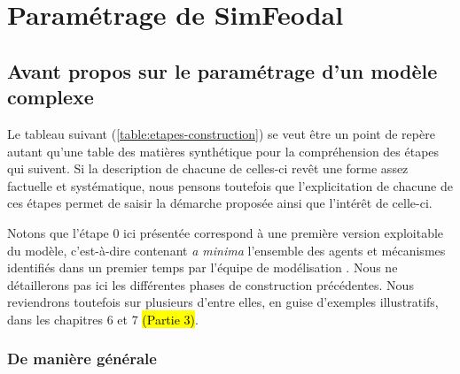 \clearpage
\section{Paramétrage de SimFeodal}
	
\subsection{Avant propos sur le paramétrage d'un modèle complexe}
	
\medbreak
	

Le tableau suivant (\cref{table:etapes-construction}) se veut être un point de repère autant qu'une table des matières synthétique pour la compréhension des étapes qui suivent. Si la description de chacune de celles-ci revêt une forme assez factuelle et systématique, nous pensons toutefois que l'explicitation de chacune de ces étapes permet de saisir la démarche proposée ainsi que l'intérêt de celle-ci.

Notons que l'étape 0 ici présentée correspond à une première version \og exploitable\fg{} du modèle, c'est-à-dire contenant \textit{a minima} l'ensemble des agents et mécanismes identifiés dans un premier temps par l'équipe de modélisation \autocite{tannier_ontologie_2014-2}. Nous ne détaillerons pas ici les différentes phases de construction précédentes. Nous reviendrons toutefois sur plusieurs d'entre elles, en guise d'exemples illustratifs, dans les chapitres 6 et 7 \hl{(Partie 3)}.

\subsubsection{De manière générale}
	
